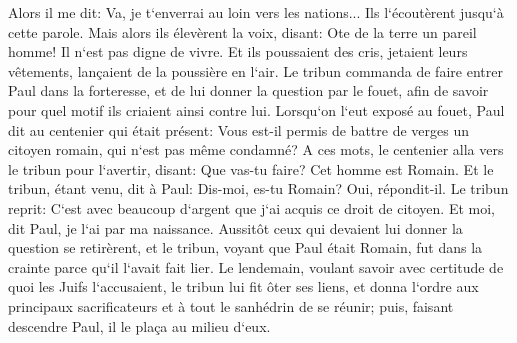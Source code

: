 \verse Alors il me dit: Va, je t`enverrai au loin vers les nations... 
\verse Ils l`écoutèrent jusqu`à cette parole. Mais alors ils élevèrent la voix, disant: Ote de la terre un pareil homme! Il n`est pas digne de vivre. 
\verse Et ils poussaient des cris, jetaient leurs vêtements, lançaient de la poussière en l`air. 
\verse Le tribun commanda de faire entrer Paul dans la forteresse, et de lui donner la question par le fouet, afin de savoir pour quel motif ils criaient ainsi contre lui. 
\verse Lorsqu`on l`eut exposé au fouet, Paul dit au centenier qui était présent: Vous est-il permis de battre de verges un citoyen romain, qui n`est pas même condamné? 
\verse A ces mots, le centenier alla vers le tribun pour l`avertir, disant: Que vas-tu faire? Cet homme est Romain. 
\verse Et le tribun, étant venu, dit à Paul: Dis-moi, es-tu Romain? Oui, répondit-il. 
\verse Le tribun reprit: C`est avec beaucoup d`argent que j`ai acquis ce droit de citoyen. Et moi, dit Paul, je l`ai par ma naissance. 
\verse Aussitôt ceux qui devaient lui donner la question se retirèrent, et le tribun, voyant que Paul était Romain, fut dans la crainte parce qu`il l`avait fait lier. 
\verse Le lendemain, voulant savoir avec certitude de quoi les Juifs l`accusaient, le tribun lui fit ôter ses liens, et donna l`ordre aux principaux sacrificateurs et à tout le sanhédrin de se réunir; puis, faisant descendre Paul, il le plaça au milieu d`eux. 

\chapter{}

